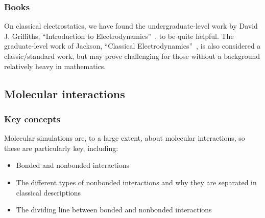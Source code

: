 \documentclass[9pt,bestpractices]{livecoms}
\begin{document}
\subsubsection{Books}

On classical electrostatics, we have found the undergraduate-level work by David J. Griffiths, ``Introduction to Electrodynamics''~\cite{Griffiths:2017:}, to be quite helpful.
The graduate-level work of Jackson, ``Classical Electrodynamics''~\cite{Jackson:1998:}, is also considered a classic/standard work, but may prove challenging for those without a background relatively heavy in mathematics.


\subsection{Molecular interactions}
\label{sec:mol_interactions}
\subsubsection{Key concepts}
Molecular simulations are, to a large extent, about molecular interactions, so these are particularly key, including:
\begin{itemize}
\item Bonded and nonbonded interactions
\item The different types of nonbonded interactions and why they are separated in classical descriptions
\item The dividing line between bonded and nonbonded interactions
\end{itemize}
\end{document}

